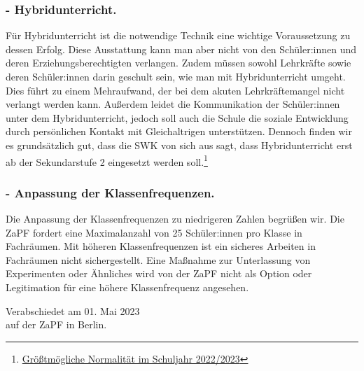 \documentclass[DIV=calc]{scrartcl}
\begin{document}
\subsubsection*{- Hybridunterricht.}
Für Hybridunterricht ist die notwendige Technik eine wichtige Voraussetzung zu dessen Erfolg. Diese Ausstattung kann man aber nicht von den Schüler:innen und deren Erziehungsberechtigten verlangen. 
Zudem müssen sowohl Lehrkräfte sowie deren Schüler:innen darin geschult sein, wie man mit Hybridunterricht umgeht. Dies führt zu einem Mehraufwand, der bei dem akuten Lehrkräftemangel nicht verlangt werden kann. Außerdem leidet die Kommunikation der Schüler:innen unter dem Hybridunterricht, jedoch soll auch die Schule die soziale Entwicklung durch persönlichen Kontakt mit Gleichaltrigen unterstützen.
Dennoch finden wir es grundsätzlich gut, dass die SWK von sich aus sagt, dass Hybridunterricht erst ab der Sekundarstufe 2 eingesetzt werden soll.\footnote{\href{www.kmk.org/fileadmin/veroeffentlichungen_beschluesse/2022/2022_06_23-Umgang-mit-Covid19-Schuljahr-22-23.pdf}{Größtmögliche Normalität im Schuljahr 2022/2023}} %

\subsubsection*{- Anpassung der Klassenfrequenzen.}
Die Anpassung der Klassenfrequenzen zu niedrigeren Zahlen begrüßen wir. %
Die ZaPF fordert eine Maximalanzahl von 25 Schüler:innen pro Klasse in Fachräumen. Mit höheren Klassenfrequenzen ist ein sicheres Arbeiten in Fachräumen nicht sichergestellt. Eine Maßnahme zur Unterlassung von Experimenten oder Ähnliches wird von der ZaPF nicht als Option oder Legitimation für eine höhere Klassenfrequenz angesehen.

\vspace{1cm} 

\vfill
\begin{flushright}
	Verabschiedet am 01. Mai 2023 \\
	auf der ZaPF in Berlin.
\end{flushright}
\end{document}
